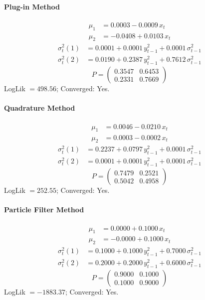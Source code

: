 \documentclass[11pt, a4paper]{article}
\begin{document}
\paragraph{Plug-in Method}
\begin{align}
\mu_{1} &= 0.0003 -0.0009\, x_t \\
\mu_{2} &= -0.0408 + 0.0103\, x_t
\end{align}
\begin{align}
\sigma^2_{t}(1) &= 0.0001 + 0.0001\, y_{t-1}^2 + 0.0001\, \sigma^2_{t-1} \\
\sigma^2_{t}(2) &= 0.0190 + 0.2387\, y_{t-1}^2 + 0.7612\, \sigma^2_{t-1}
\end{align}
\begin{equation}
P = \begin{pmatrix} 0.3547 & 0.6453 \\ 0.2331 & 0.7669 \end{pmatrix}
\end{equation}
LogLik $= 498.56$; Converged: Yes.

\paragraph{Quadrature Method}
\begin{align}
\mu_{1} &= 0.0046 -0.0210\, x_t \\
\mu_{2} &= 0.0003 -0.0002\, x_t
\end{align}
\begin{align}
\sigma^2_{t}(1) &= 0.2237 + 0.0797\, y_{t-1}^2 + 0.0001\, \sigma^2_{t-1} \\
\sigma^2_{t}(2) &= 0.0001 + 0.0001\, y_{t-1}^2 + 0.0001\, \sigma^2_{t-1}
\end{align}
\begin{equation}
P = \begin{pmatrix} 0.7479 & 0.2521 \\ 0.5042 & 0.4958 \end{pmatrix}
\end{equation}
LogLik $= 252.55$; Converged: Yes.

\paragraph{Particle Filter Method}
\begin{align}
\mu_{1} &= 0.0000 + 0.1000\, x_t \\
\mu_{2} &= -0.0000 + 0.1000\, x_t
\end{align}
\begin{align}
\sigma^2_{t}(1) &= 0.1000 + 0.1000\, y_{t-1}^2 + 0.7000\, \sigma^2_{t-1} \\
\sigma^2_{t}(2) &= 0.2000 + 0.2000\, y_{t-1}^2 + 0.6000\, \sigma^2_{t-1}
\end{align}
\begin{equation}
P = \begin{pmatrix} 0.9000 & 0.1000 \\ 0.1000 & 0.9000 \end{pmatrix}
\end{equation}
LogLik $= -1883.37$; Converged: Yes.
\end{document}
